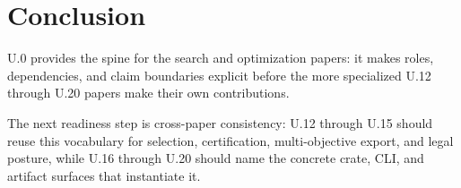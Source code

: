 \section{Conclusion}

U.0 provides the spine for the search and optimization papers: it makes roles,
dependencies, and claim boundaries explicit before the more specialized U.12
through U.20 papers make their own contributions.

The next readiness step is cross-paper consistency: U.12 through U.15 should
reuse this vocabulary for selection, certification, multi-objective export, and
legal posture, while U.16 through U.20 should name the concrete crate, CLI, and
artifact surfaces that instantiate it.
